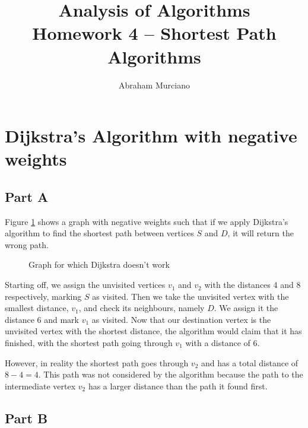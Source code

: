 \documentclass{article}
\title{Analysis of Algorithms \\
\medskip
\large Homework 4 -- Shortest Path Algorithms}
\author{Abraham Murciano}
\begin{document}
\maketitle

\section{Dijkstra's Algorithm with negative weights}

\subsection*{Part A}

Figure \ref{q1a} shows a graph with negative weights such that if we apply Dijkstra's algorithm to find the shortest path between vertices \(S\) and \(D\), it will return the wrong path.

\begin{figure}[h]
	\centering
	\caption{Graph for which Dijkstra doesn't work}
	\label{q1a}
\end{figure}

Starting off, we assign the unvisited vertices \(v_1\) and \(v_2\) with the distances 4 and 8 respectively, marking \(S\) as visited. Then we take the unvisited vertex with the smallest distance, \(v_1\), and check its neighbours, namely \(D\). We assign it the distance 6 and mark \(v_1\) as visited. Now that our destination vertex is the unvisited vertex with the shortest distance, the algorithm would claim that it has finished, with the shortest path going through \(v_1\) with a distance of 6.

However, in reality the shortest path goes through \(v_2\) and has a total distance of \(8 - 4 = 4\). This path was not considered by the algorithm because the path to the intermediate vertex \(v_2\) has a larger distance than the path it found first.

\subsection*{Part B}
\end{document}
